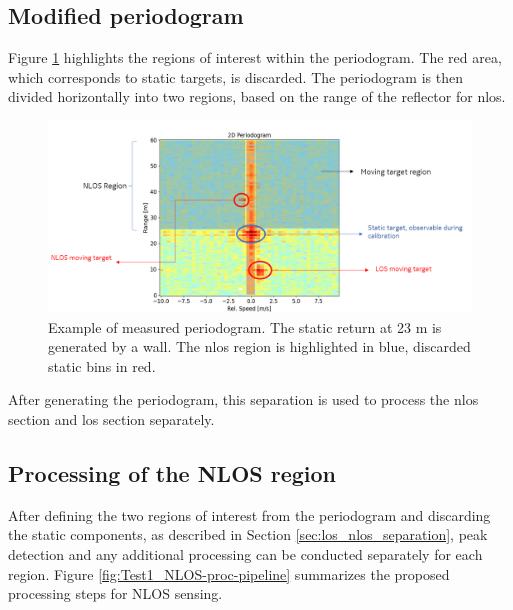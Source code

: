 	
		\subsection{Modified periodogram}
		
			Figure \ref{fig:Rad_nlos_los_separation} highlights the regions of interest within the periodogram.
			The red area, which corresponds to static targets, is discarded. The periodogram is then divided horizontally into two regions, based on the range of the reflector for \gls{nlos}.
			
			\begin{figure}[H]
				\centering
				\includegraphics[width=1.1\textwidth]{Images/Test1/nlos-los-separation.png}
				\caption{\small Example of measured periodogram.
					The static return at 23 m is generated by a wall.
					The \gls{nlos} region is highlighted in blue, discarded static bins in red.}
				\label{fig:Rad_nlos_los_separation}
			\end{figure}
			
			
			After generating the periodogram, this separation is used to process the \gls{nlos} section and \gls{los} section separately.
		
		\subsection{Processing of the NLOS region}
		
			After defining the two regions of interest from the periodogram and discarding the static components, as described in Section \ref{sec:los_nlos_separation}, peak detection and any additional processing can be conducted separately for each region. 
			Figure \ref{fig:Test1_NLOS-proc-pipeline} summarizes the proposed processing steps for NLOS sensing.
			
			
